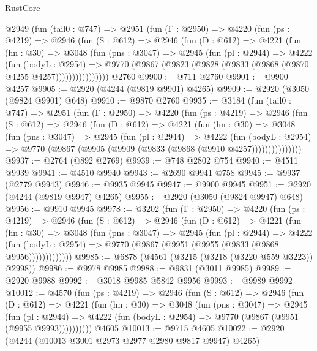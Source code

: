 \begin{lexlean}{RustCore}
\begin{coremodule}
    @2949
      (fun (tail0 : @747) =>
      @2951
        (fun (Γ : @2950) =>
        @4220
          (fun (ps : @4219) =>
          @2946
            (fun (S : @612) =>
            @2946
              (fun (D : @612) =>
              @4221
                (fun (hn : @30) =>
                @3048
                  (fun (pns : @3047) =>
                  @2945
                    (fun (pl : @2944) =>
                    @4222
                      (fun (bodyL : @2954) =>
                      @9770 (@9867 (@9823 (@9828 (@9833 (@9868 (@9870 @4255 @4257))))))))))))))))
    @2760
@9900 := @711 @2760
@9901 := @9900 @4257
@9905 := @2920 (@4244 (@9819 @9901) @4265)
@9909 := @2920 (@3050 (@9824 @9901) @648)
@9910 := @9870 @2760
@9935 := @3184
    (fun (tail0 : @747) =>
    @2951
      (fun (Γ : @2950) =>
      @4220
        (fun (ps : @4219) =>
        @2946
          (fun (S : @612) =>
          @2946
            (fun (D : @612) =>
            @4221
              (fun (hn : @30) =>
              @3048
                (fun (pns : @3047) =>
                @2945
                  (fun (pl : @2944) =>
                  @4222
                    (fun (bodyL : @2954) =>
                    @9770 (@9867 (@9905 (@9909 (@9833 (@9868 (@9910 @4257)))))))))))))))
@9937 := @2764 (@892 @2769)
@9939 := @748 @2802 @754
@9940 := @4511 @9939
@9941 := @4510 @9940
@9943 := @2690 @9941 @758
@9945 := @9937 (@2779 @9943)
@9946 := @9935 @9945
@9947 := @9900 @9945
@9951 := @2920 (@4244 (@9819 @9947) @4265)
@9955 := @2920 (@3050 (@9824 @9947) @648)
@9956 := @9910 @9945
@9978 := @3202
    (fun (Γ : @2950) =>
    @4220
      (fun (ps : @4219) =>
      @2946
        (fun (S : @612) =>
        @2946
          (fun (D : @612) =>
          @4221
            (fun (hn : @30) =>
            @3048
              (fun (pns : @3047) =>
              @2945
                (fun (pl : @2944) =>
                @4222
                  (fun (bodyL : @2954) =>
                  @9770 (@9867 (@9951 (@9955 (@9833 (@9868 @9956)))))))))))))
@9985 := @6878 (@4561 (@3215 (@3218 (@3220 @559 @3223)) @2998))
@9986 := @9978 @9985
@9988 := @9831 (@3011 @9985)
@9989 := @2920 @9988
@9992 := @3018 @9985 @5842 @9956
@9993 := @9989 @9992
@10012 := @4570
    (fun (ps : @4219) =>
    @2946
      (fun (S : @612) =>
      @2946
        (fun (D : @612) =>
        @4221
          (fun (hn : @30) =>
          @3048
            (fun (pns : @3047) =>
            @2945
              (fun (pl : @2944) =>
              @4222 (fun (bodyL : @2954) => @9770 (@9867 (@9951 (@9955 @9993))))))))))
    @4605
@10013 := @9715 @4605
@10022 := @2920 (@4244 (@10013 @3001 @2973 @2977 @2980 @9817 @9947) @4265)

\end{coremodule}
\end{lexlean}
